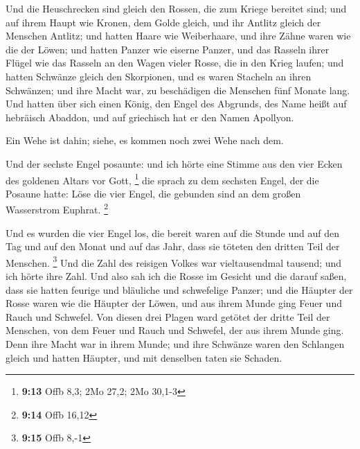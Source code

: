  Und die Heuschrecken sind gleich den Rossen, die zum Kriege
bereitet sind; und auf ihrem Haupt wie Kronen, dem Golde gleich, und ihr
Antlitz gleich der Menschen Antlitz;  und hatten Haare wie
Weiberhaare, und ihre Zähne waren wie die der Löwen;  und
hatten Panzer wie eiserne Panzer, und das Rasseln ihrer Flügel wie das
Rasseln an den Wagen vieler Rosse, die in den Krieg laufen;
 und hatten Schwänze gleich den Skorpionen, und es waren
Stacheln an ihren Schwänzen; und ihre Macht war, zu beschädigen die
Menschen fünf Monate lang.  Und hatten über sich einen
König, den Engel des Abgrunds, des Name heißt auf hebräisch Abaddon, und
auf griechisch hat er den Namen Apollyon.

 Ein Wehe ist dahin; siehe, es kommen noch zwei Wehe nach
dem.

 Und der sechste Engel posaunte: und ich hörte eine Stimme
aus den vier Ecken des goldenen Altars vor Gott, \footnote{\textbf{9:13}
  Offb 8,3; 2Mo 27,2; 2Mo 30,1-3}  die sprach zu dem
sechsten Engel, der die Posaune hatte: Löse die vier Engel, die gebunden
sind an dem großen Wasserstrom Euphrat. \footnote{\textbf{9:14} Offb
  16,12}

 Und es wurden die vier Engel los, die bereit waren auf die
Stunde und auf den Tag und auf den Monat und auf das Jahr, dass sie
töteten den dritten Teil der Menschen. \footnote{\textbf{9:15} Offb 8,-1}
 Und die Zahl des reisigen Volkes war vieltausendmal
tausend; und ich hörte ihre Zahl.  Und also sah ich die
Rosse im Gesicht und die darauf saßen, dass sie hatten feurige und
bläuliche und schwefelige Panzer; und die Häupter der Rosse waren wie
die Häupter der Löwen, und aus ihrem Munde ging Feuer und Rauch und
Schwefel.  Von diesen drei Plagen ward getötet der dritte
Teil der Menschen, von dem Feuer und Rauch und Schwefel, der aus ihrem
Munde ging.  Denn ihre Macht war in ihrem Munde; und ihre
Schwänze waren den Schlangen gleich und hatten Häupter, und mit
denselben taten sie Schaden.

